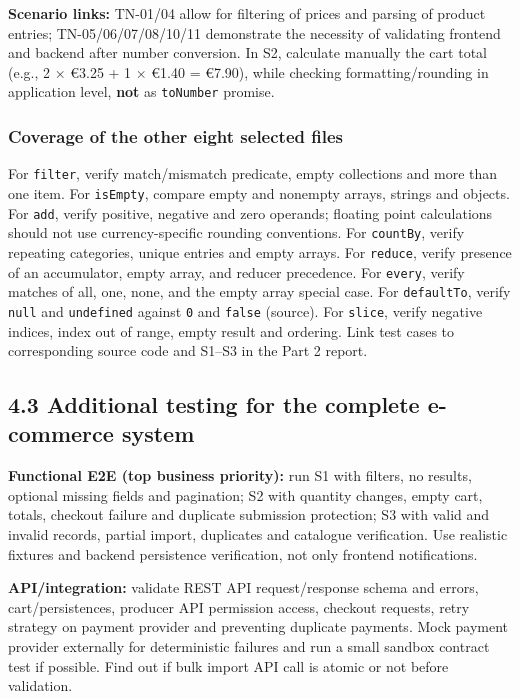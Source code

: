 \documentclass[
  9pt,
]{article}
\begin{document}
\textbf{Scenario links:} TN-01/04 allow for filtering of prices and
parsing of product entries; TN-05/06/07/08/10/11 demonstrate the
necessity of validating frontend and backend after number conversion. In
S2, calculate manually the cart total (e.g., 2 × €3.25 + 1 × €1.40 =
€7.90), while checking formatting/rounding in application level,
\textbf{not} as \texttt{toNumber} promise.

\subsubsection{Coverage of the other eight selected
files}\label{coverage-of-the-other-eight-selected-files}

For \texttt{filter}, verify match/mismatch predicate, empty collections
and more than one item. For \texttt{isEmpty}, compare empty and nonempty
arrays, strings and objects. For \texttt{add}, verify positive, negative
and zero operands; floating point calculations should not use
currency-specific rounding conventions. For \texttt{countBy}, verify
repeating categories, unique entries and empty arrays. For
\texttt{reduce}, verify presence of an accumulator, empty array, and
reducer precedence. For \texttt{every}, verify matches of all, one,
none, and the empty array special case. For \texttt{defaultTo}, verify
\texttt{null} and \texttt{undefined} against \texttt{0} and
\texttt{false} (source). For \texttt{slice}, verify negative indices,
index out of range, empty result and ordering. Link test cases to
corresponding source code and S1--S3 in the Part 2 report.

\subsection{4.3 Additional testing for the complete e-commerce
system}\label{additional-testing-for-the-complete-e-commerce-system}

\textbf{Functional E2E (top business priority):} run S1 with filters, no
results, optional missing fields and pagination; S2 with quantity
changes, empty cart, totals, checkout failure and duplicate submission
protection; S3 with valid and invalid records, partial import,
duplicates and catalogue verification. Use realistic fixtures and
backend persistence verification, not only frontend notifications.

\textbf{API/integration:} validate REST API request/response schema and
errors, cart/persistences, producer API permission access, checkout
requests, retry strategy on payment provider and preventing duplicate
payments. Mock payment provider externally for deterministic failures
and run a small sandbox contract test if possible. Find out if bulk
import API call is atomic or not before validation.
\end{document}
